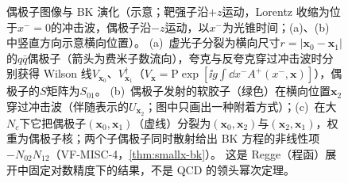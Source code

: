 \begin{figure}[htbp]
\caption{偶极子图像与 BK 演化（示意；靶强子沿$+z$运动，Lorentz 收缩为位于$x^-=0$的冲击波，偶极子沿$-z$运动，以$x^-$为光锥时间；(a)、(b) 中竖直方向示意横向位置）。
(a)~虚光子分裂为横向尺寸$r=|\boldsymbol x_0-\boldsymbol x_1|$的$q\bar q$偶极子（箭头为费米子数流向），夸克与反夸克穿过冲击波时分别获得 Wilson 线$V_{\boldsymbol x_0}$、$V^\dagger_{\boldsymbol x_1}$（$V_{\boldsymbol x}=\mathrm P\exp[\ii g\int\dd x^-A^+(x^-,\boldsymbol x)]$），偶极子的$S$矩阵为$S_{01}$。
(b)~偶极子发射的软胶子（绿色）在横向位置$\boldsymbol x_2$穿过冲击波（伴随表示的$U_{\boldsymbol x_2}$；图中只画出一种附着方式）；(c)~在大$N_c$下它把偶极子$(\boldsymbol x_0,\boldsymbol x_1)$（虚线）分裂为$(\boldsymbol x_0,\boldsymbol x_2)$与$(\boldsymbol x_2,\boldsymbol x_1)$，权重为偶极子核；两个子偶极子同时散射给出 BK 方程的非线性项$-N_{02}N_{12}$（VF-MISC-4，\cref{thm:smallx-bk}）。
这是 Regge（程函）展开中固定对数精度下的结果，不是 QCD 的领头幂次定理。}
\label{fig:smallx-dipole}
\end{figure}


